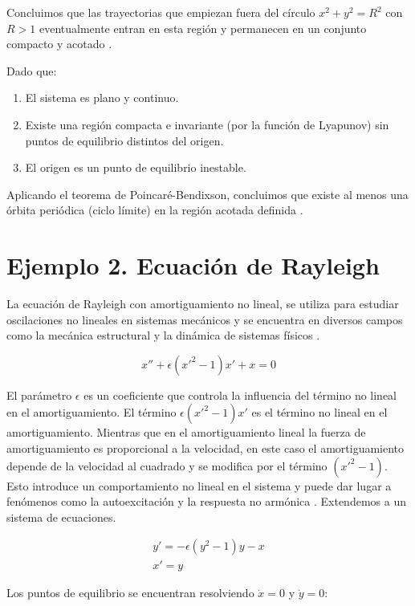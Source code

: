 Concluimos que las trayectorias que empiezan fuera del círculo \( x^2 + y^2 = R^2 \) con \( R > 1 \) eventualmente entran en esta región y permanecen en un conjunto compacto y acotado \cite{hahn1967stability}.

Dado que:

\begin{enumerate}
    \item El sistema es plano y continuo.
    \item Existe una región compacta e invariante (por la función de Lyapunov) sin puntos de equilibrio distintos del origen.
    \item El origen es un punto de equilibrio inestable.
\end{enumerate}

Aplicando el teorema de Poincaré-Bendixson, concluimos que existe al menos una órbita periódica (ciclo límite) en la región acotada definida \cite{lasalle1961stability}.
\section{Ejemplo 2. Ecuación de Rayleigh}
La ecuación de Rayleigh con amortiguamiento no lineal, se utiliza
para estudiar oscilaciones no lineales en sistemas mecánicos y se encuentra en
diversos campos como la mecánica estructural y la dinámica de sistemas físicos \cite{rayleigh1883theory}.

$$x''+\epsilon(x'^2-1)x'+x=0$$

El parámetro $\epsilon$ es un coeficiente que controla la influencia del término no lineal en el amortiguamiento.
El término $\epsilon(x'^2 - 1)x'$ es el término no lineal en el amortiguamiento. Mientras que en el amortiguamiento
lineal la fuerza de amortiguamiento es proporcional a la velocidad, en este caso el amortiguamiento depende de
la velocidad al cuadrado y se modifica por el término $(x'^2 - 1)$. Esto introduce un comportamiento no lineal en el
sistema y puede dar lugar a fenómenos como la autoexcitación y la respuesta no armónica \cite{strogatz2018nonlinear}.
Extendemos a un sistema de ecuaciones.

\begin{equation}\label{eq: Rayleigh}
	\begin{matrix}
		y'=-\epsilon(y^2-1)y-x \\ 
		x'=y
	\end{matrix}
\end{equation}

Los puntos de equilibrio se encuentran resolviendo \(\dot{x} = 0\) y \(\dot{y} = 0\):

